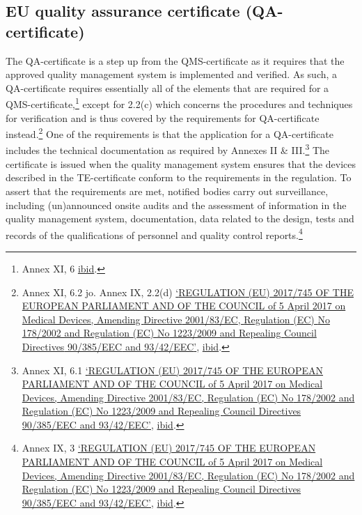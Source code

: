 \documentclass[
]{scrartcl}
\begin{document}
\hypertarget{eu-quality-assurance-certificate-qa-certificate}{%
\subsection{EU quality assurance certificate (QA-certificate)}\label{eu-quality-assurance-certificate-qa-certificate}}

The QA-certificate is a step up from the QMS-certificate as it requires that the approved quality management system is implemented and verified. As such, a QA-certificate requires essentially all of the elements that are required for a QMS-certificate,\footnote{Annex XI, 6 \protect\hyperlink{ref-REGULATIONEU2017a}{ibid}.} except for 2.2(c) which concerns the procedures and techniques for verification and is thus covered by the requirements for QA-certificate instead.\footnote{Annex XI, 6.2 jo. Annex IX, 2.2(d) \protect\hyperlink{ref-REGULATIONEU2017a}{{`{REGULATION} ({EU}) 2017/745 {OF THE EUROPEAN PARLIAMENT AND OF THE COUNCIL} of 5 {April} 2017 on Medical Devices, Amending {Directive} 2001/83/{EC}, {Regulation} ({EC}) {No} 178/2002 and {Regulation} ({EC}) {No} 1223/2009 and Repealing {Council Directives} 90/385/{EEC} and 93/42/{EEC}'}}, \protect\hyperlink{ref-REGULATIONEU2017a}{ibid}.} One of the requirements is that the application for a QA-certificate includes the technical documentation as required by Annexes II \& III.\footnote{Annex XI, 6.1 \protect\hyperlink{ref-REGULATIONEU2017a}{{`{REGULATION} ({EU}) 2017/745 {OF THE EUROPEAN PARLIAMENT AND OF THE COUNCIL} of 5 {April} 2017 on Medical Devices, Amending {Directive} 2001/83/{EC}, {Regulation} ({EC}) {No} 178/2002 and {Regulation} ({EC}) {No} 1223/2009 and Repealing {Council Directives} 90/385/{EEC} and 93/42/{EEC}'}}, \protect\hyperlink{ref-REGULATIONEU2017a}{ibid}.} The certificate is issued when the quality management system ensures that the devices described in the TE-certificate conform to the requirements in the regulation. To assert that the requirements are met, notified bodies carry out surveillance, including (un)announced onsite audits and the assessment of information in the quality management system, documentation, data related to the design, tests and records of the qualifications of personnel and quality control reports.\footnote{Annex IX, 3 \protect\hyperlink{ref-REGULATIONEU2017a}{{`{REGULATION} ({EU}) 2017/745 {OF THE EUROPEAN PARLIAMENT AND OF THE COUNCIL} of 5 {April} 2017 on Medical Devices, Amending {Directive} 2001/83/{EC}, {Regulation} ({EC}) {No} 178/2002 and {Regulation} ({EC}) {No} 1223/2009 and Repealing {Council Directives} 90/385/{EEC} and 93/42/{EEC}'}}, \protect\hyperlink{ref-REGULATIONEU2017a}{ibid}.}
\end{document}
